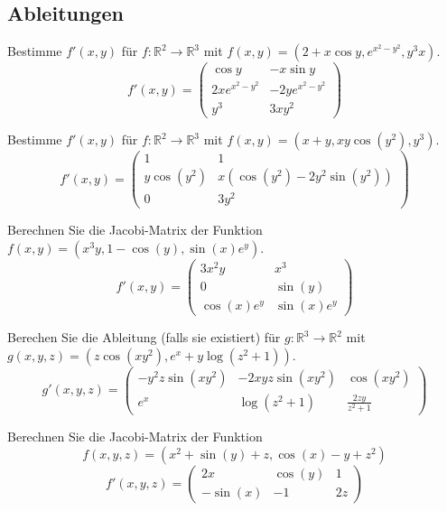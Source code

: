 \documentclass[parskip=full]{scrartcl}
\begin{document}
\subsection{Ableitungen}
Bestimme $f'(x,y)$ für $f : \mathbb{R}^2 \to \mathbb{R}^3$ mit $f(x,y) = (2 + x \cos y, e^{x^2 - y^2}, y^3 x)$.
\begin{displaymath}
  f'(x,y) = 
  \begin{pmatrix}
    \cos y & -x \sin y\\
    2x e^{x^2 - y^2} & -2y e^{x^2 - y^2}\\
    y^3 & 3xy^2
  \end{pmatrix}
\end{displaymath}

Bestimme $f'(x,y)$ für $f : \mathbb{R}^2 \to \mathbb{R}^3$ mit $f(x,y) = (x + y, xy\cos(y^2), y^3)$.
\begin{displaymath}
  f'(x,y) = 
  \begin{pmatrix}
    1 & 1\\
    y\cos(y^2) & x(\cos(y^2) - 2y^2\sin(y^2))\\
    0 & 3y^2
  \end{pmatrix}
\end{displaymath}

Berechnen Sie die Jacobi-Matrix der Funktion $f(x,y) = (x^3y, 1 - \cos(y), \sin(x)e^y)$.
\begin{displaymath}
  f'(x,y) =
  \begin{pmatrix}
    3x^2y & x^3\\
    0 & \sin(y)\\
    \cos(x)e^y & \sin(x)e^y
  \end{pmatrix}
\end{displaymath}

Berechen Sie die Ableitung (falls sie existiert) für $g : \mathbb{R}^3 \to \mathbb{R}^2$ mit $g(x,y,z) = (z \cos(xy^2), e^x + y \log(z^2 + 1))$.
\begin{displaymath}
  g'(x,y,z) = 
  \begin{pmatrix}
    -y^2z \sin(xy^2) & -2xyz \sin(xy^2) & \cos(xy^2)\\
    e^x & \log(z^2 + 1) & \frac{2zy}{z^2 + 1}
  \end{pmatrix}
\end{displaymath}

Berechnen Sie die Jacobi-Matrix der Funktion
\begin{displaymath}
  f(x,y,z) = (x^2 + \sin(y) + z, \cos(x) - y + z^2)
\end{displaymath}
\begin{displaymath}
  f'(x,y,z) =
  \begin{pmatrix}
    2x & \cos(y) & 1\\
    -\sin(x) & -1 & 2z
  \end{pmatrix}
\end{displaymath}
\end{document}
